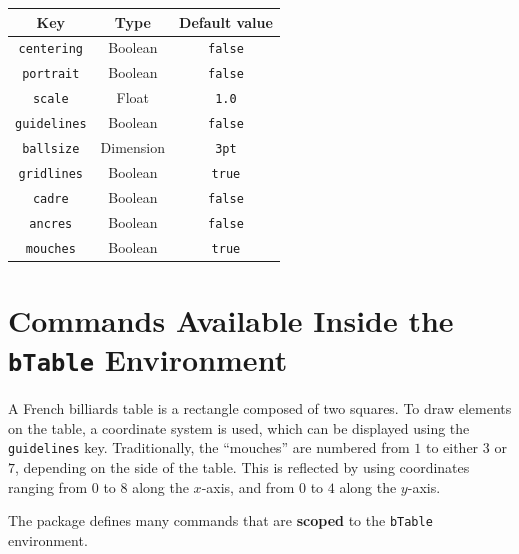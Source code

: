 \documentclass[11pt,a4paper]{ltxdoc}
\def\bluett#1{{\color{blue}\texttt{#1}}}
\begin{document}
\begin{center}
    \begin{tabular}{ccc}
        \toprule
        \textbf{Key} & \textbf{Type} &\textbf{Default value} \\\toprule
        \bluett{centering} & Boolean & \texttt{false} \\\midrule
        \bluett{portrait} & Boolean & \texttt{false} \\\midrule
        \bluett{scale} & Float & \texttt{1.0} \\\midrule
        \bluett{guidelines} & Boolean & \texttt{false} \\\midrule
        \bluett{ballsize} & Dimension & \texttt{3pt} \\\midrule
        \bluett{gridlines} & Boolean & \texttt{true} \\\midrule
        \bluett{cadre} & Boolean & \texttt{false} \\\midrule
        \bluett{ancres} & Boolean & \texttt{false} \\\midrule
        \bluett{mouches} & Boolean & \texttt{true} \\\bottomrule
    \end{tabular}
\end{center}

\section{Commands Available Inside the \bluett{bTable} Environment}

A French billiards table is a rectangle composed of two squares. To draw elements on the table, a coordinate system is used, which can be displayed using the \bluett{guidelines} key. Traditionally, the ``mouches'' are numbered from $1$ to either $3$ or $7$, depending on the side of the table. This is reflected by using coordinates ranging from $0$ to $8$ along the $x$-axis, and from $0$ to $4$ along the $y$-axis.

The package defines many commands that are \textbf{scoped} to the \bluett{bTable} environment.
\end{document}
